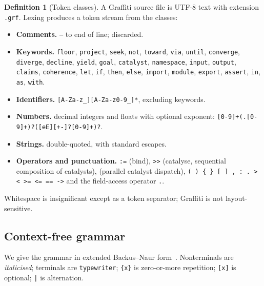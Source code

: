 \documentclass[11pt,twocolumn,a4paper]{article}
\theoremstyle{thmstyle}
\theoremstyle{definition}
\newtheorem{definition}[theorem]{Definition}
\theoremstyle{remark}
\begin{document}
\begin{definition}[Token classes]
\label{def:tokens}
A Graffiti source file is UTF-8 text with extension \texttt{.grf}.
Lexing produces a token stream from the classes:
\begin{itemize}[leftmargin=1.4em,itemsep=1pt]
\item \textbf{Comments.} \texttt{--} to end of line; discarded.
\item \textbf{Keywords.} \texttt{floor}, \texttt{project}, \texttt{seek},
\texttt{not}, \texttt{toward}, \texttt{via}, \texttt{until},
\texttt{converge}, \texttt{diverge}, \texttt{decline}, \texttt{yield},
\texttt{goal}, \texttt{catalyst}, \texttt{namespace}, \texttt{input},
\texttt{output}, \texttt{claims}, \texttt{coherence}, \texttt{let},
\texttt{if}, \texttt{then}, \texttt{else}, \texttt{import},
\texttt{module}, \texttt{export}, \texttt{assert}, \texttt{in},
\texttt{as}, \texttt{with}.
\item \textbf{Identifiers.} \texttt{[A-Za-z\_][A-Za-z0-9\_]*}, excluding
keywords.
\item \textbf{Numbers.} decimal integers and floats with optional
exponent: \texttt{[0-9]+(\allowbreak.[0-9]+)?\allowbreak([eE][+-]?[0-9]+)?}.
\item \textbf{Strings.} double-quoted, with standard escapes.
\item \textbf{Operators and punctuation.} \texttt{:=} (bind),
\texttt{>>} (catalyse, sequential composition of catalysts),
\texttt{\textbar\textbar} (parallel catalyst dispatch),
\texttt{( ) \{ \} [ ] , : . > < >= <= == ->} and the field-access
operator \texttt{.}.
\end{itemize}
Whitespace is insignificant except as a token separator; Graffiti is not
layout-sensitive.
\end{definition}

\subsection{Context-free grammar}

We give the grammar in extended Backus--Naur
form~\citep{backus1959,naur1963,aho2006}. Nonterminals are
\textit{italicised}; terminals are \texttt{typewriter}; \texttt{\{x\}} is
zero-or-more repetition; \texttt{[x]} is optional; \texttt{|} is
alternation.
\end{document}
